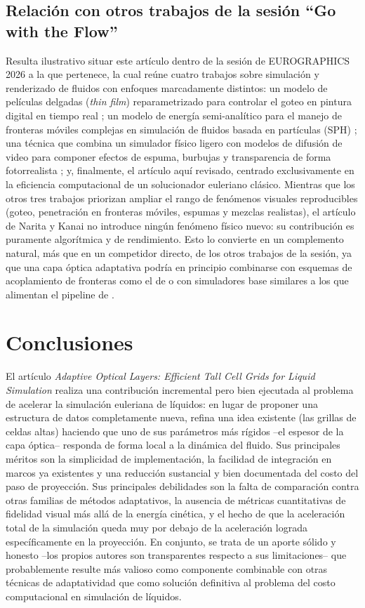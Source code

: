 \documentclass[sigconf,nonacm]{acmart}
\begin{document}
\subsection{Relación con otros trabajos de la sesión ``Go with the Flow''}
Resulta ilustrativo situar este artículo dentro de la sesión de EUROGRAPHICS 2026 a la que pertenece, la cual reúne cuatro trabajos sobre simulación y renderizado de fluidos con enfoques marcadamente distintos: un modelo de películas delgadas (\emph{thin film}) reparametrizado para controlar el goteo en pintura digital en tiempo real \cite{herson2026}; un modelo de energía semi-analítico para el manejo de fronteras móviles complejas en simulación de fluidos basada en partículas (SPH) \cite{liu2026}; una técnica que combina un simulador físico ligero con modelos de difusión de video para componer efectos de espuma, burbujas y transparencia de forma fotorrealista \cite{chen2025}; y, finalmente, el artículo aquí revisado, centrado exclusivamente en la eficiencia computacional de un solucionador euleriano clásico. Mientras que los otros tres trabajos priorizan ampliar el rango de fenómenos visuales reproducibles (goteo, penetración en fronteras móviles, espumas y mezclas realistas), el artículo de Narita y Kanai no introduce ningún fenómeno físico nuevo: su contribución es puramente algorítmica y de rendimiento. Esto lo convierte en un complemento natural, más que en un competidor directo, de los otros trabajos de la sesión, ya que una capa óptica adaptativa podría en principio combinarse con esquemas de acoplamiento de fronteras como el de \cite{liu2026} o con simuladores base similares a los que alimentan el pipeline de \cite{chen2025}.

\section{Conclusiones}
El artículo \emph{Adaptive Optical Layers: Efficient Tall Cell Grids for Liquid Simulation} realiza una contribución incremental pero bien ejecutada al problema de acelerar la simulación euleriana de líquidos: en lugar de proponer una estructura de datos completamente nueva, refina una idea existente (las grillas de celdas altas) haciendo que uno de sus parámetros más rígidos --el espesor de la capa óptica-- responda de forma local a la dinámica del fluido. Sus principales méritos son la simplicidad de implementación, la facilidad de integración en marcos ya existentes y una reducción sustancial y bien documentada del costo del paso de proyección. Sus principales debilidades son la falta de comparación contra otras familias de métodos adaptativos, la ausencia de métricas cuantitativas de fidelidad visual más allá de la energía cinética, y el hecho de que la aceleración total de la simulación queda muy por debajo de la aceleración lograda específicamente en la proyección. En conjunto, se trata de un aporte sólido y honesto --los propios autores son transparentes respecto a sus limitaciones-- que probablemente resulte más valioso como componente combinable con otras técnicas de adaptatividad que como solución definitiva al problema del costo computacional en simulación de líquidos.
\end{document}
